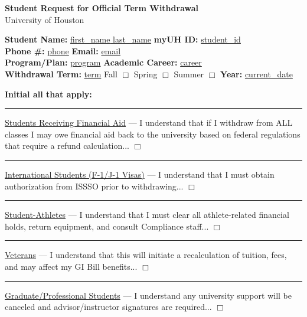 \documentclass[9pt]{article}
\begin{document}
\begin{center}
    {\Large \textbf{Student Request for Official Term Withdrawal}}\\
    \vspace{0.5em}
    University of Houston
\end{center}

\vspace{1em} 

\noindent \textbf{Student Name:} \underline{{{first_name}} {{last_name}}} \hfill \textbf{myUH ID:} \underline{{{student_id}}} \\
\textbf{Phone \#:} \underline{{{phone}}} \hfill \textbf{Email:} \underline{{{email}}} \\
\textbf{Program/Plan:} \underline{{{program}}} \hfill \textbf{Academic Career:} \underline{{{career}}} \\
\textbf{Withdrawal Term:} \underline{{{term}}} \quad Fall $\Box$ \quad Spring $\Box$ \quad Summer $\Box$ \hfill \textbf{Year:} \underline{{{current_date}}}

\vspace{1.5em}
\noindent \textbf{Initial all that apply:}

\vspace{0.5em}

\noindent \rule{1in}{0.4pt} \quad \underline{Students Receiving Financial Aid} — I understand that if I withdraw from ALL classes I may owe financial aid back to the university based on federal regulations that require a refund calculation... $\Box$ \\[0.8em]

\noindent \rule{1in}{0.4pt} \quad \underline{International Students (F-1/J-1 Visas)} — I understand that I must obtain authorization from ISSSO prior to withdrawing... $\Box$ \\[0.8em]

\noindent \rule{1in}{0.4pt} \quad \underline{Student-Athletes} — I understand that I must clear all athlete-related financial holds, return equipment, and consult Compliance staff... $\Box$ \\[0.8em]

\noindent \rule{1in}{0.4pt} \quad \underline{Veterans} — I understand that this will initiate a recalculation of tuition, fees, and may affect my GI Bill benefits... $\Box$ \\[0.8em]

\noindent \rule{1in}{0.4pt} \quad \underline{Graduate/Professional Students} — I understand any university support will be canceled and advisor/instructor signatures are required... $\Box$ \\[0.8em]
\end{document}
